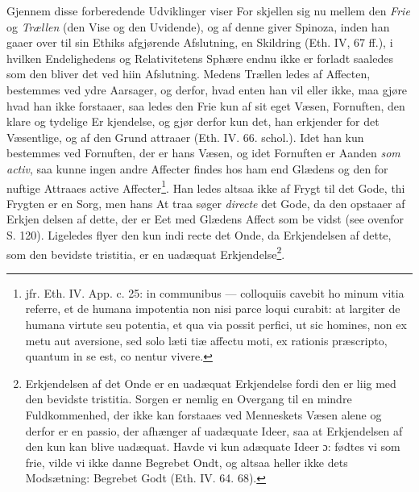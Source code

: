 \documentclass[12pt,a4paper]{book}
\newcommand{\opage}[1]{\marginnote{\footnotesize\textit{[#1]}}}
\begin{document}

\opage{130} \setcounter{footnote}{0}%
Gjennem disse forberedende Udviklinger viser For\-%
skjellen sig nu mellem den \emph{Frie} og \emph{Trællen} (den Vise og
den Uvidende), og af denne giver Spinoza, inden han gaaer
over til sin Ethiks afgjørende Afslutning, en Skildring (Eth.
IV, 67 ff.), i hvilken Endelighedens og Relativitetens Sphære
endnu ikke er forladt saaledes som den bliver det ved hiin
Afslutning. Medens Trællen ledes af Affecten, bestemmes
ved ydre Aarsager, og derfor, hvad enten han vil eller ikke,
maa gjøre hvad han ikke forstaaer, saa ledes den Frie kun
af sit eget Væsen, Fornuften, den klare og tydelige Er\-%
kjendelse, og gjør derfor kun det, han erkjender for det
Væsentlige, og af den Grund attraaer (Eth. IV. 66. schol.).
Idet han kun bestemmes ved Fornuften, der er hans Væsen,
og idet Fornuften er Aanden \emph{som activ}, saa kunne ingen
andre Affecter findes hos ham end Glædens og den for\-%
nuftige Attraaes active Affecter\footnote{jfr. Eth. IV. App. c. 25: in communibus --- colloquiis cavebit ho\-%
minum vitia referre, et de humana impotentia non nisi parce loqui
curabit: at largiter de humana virtute seu potentia, et qua via possit
perfici, ut sic homines, non ex metu aut aversione, sed solo læti\-%
tiæ affectu moti, ex rationis præscripto, quantum in se est, co\-%
nentur vivere.}. Han ledes altsaa ikke af
Frygt til det Gode, thi Frygten er en Sorg, men hans At\-%
traa søger \emph{directe} det Gode, da den opstaaer af Erkjen\-%
delsen af dette, der er Eet med Glædens Affect som be\-%
vidst (see ovenfor S. 120). Ligeledes flyer den kun indi\-%
recte det Onde, da Erkjendelsen af dette, som den bevidste
tristitia, er en uadæquat Erkjendelse\footnote{Erkjendelsen af det Onde er en uadæquat Erkjendelse fordi den er
liig med den bevidste tristitia. Sorgen er nemlig en Overgang til
en mindre Fuldkommenhed, der ikke kan forstaaes ved Menneskets
Væsen alene og derfor er en passio, der afhænger af uadæquate
Ideer, saa at Erkjendelsen af den kun kan blive uadæquat. Havde
vi kun adæquate Ideer ɔ: fødtes vi som frie, vilde vi ikke danne
Begrebet Ondt, og altsaa heller ikke dets Modsætning: Begrebet
Godt (Eth. IV. 64. 68).}.
\end{document}
